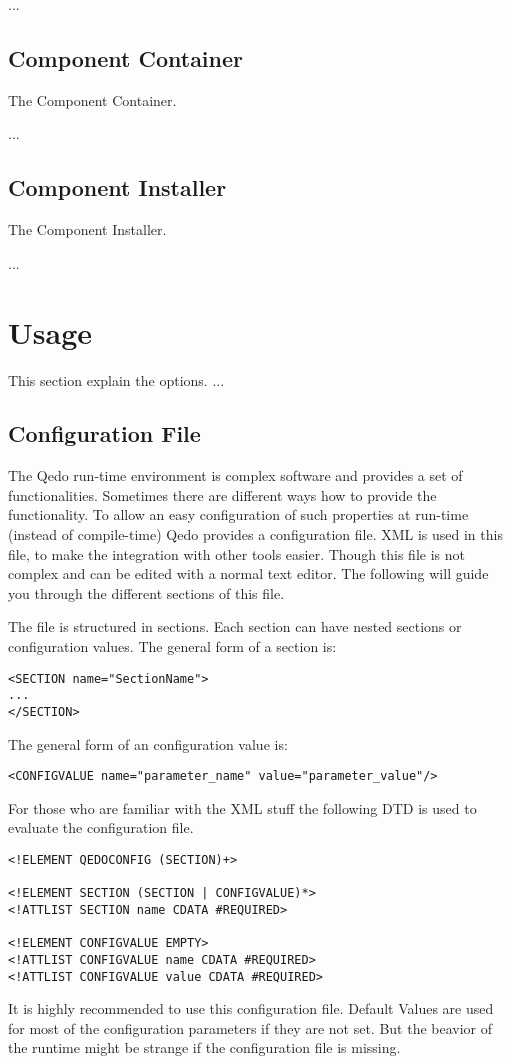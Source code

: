 \documentclass[12pt,a4paper]{report}
\begin{document}
 ... 

\section{Component Container}
\label{sec:ComponentContainer}
The Component Container. 

...

\section{Component Installer}
\label{sec:ComponentInstaller}
The Component Installer.

...

\chapter{Usage}
\label{sec:Usage}
This section explain the options. ...

\section{Configuration File}
\label{sec:ConfigurationFile}
The Qedo run-time environment is complex software and provides a set of functionalities. Sometimes there are different ways how to provide the functionality. To allow an easy configuration of such properties at run-time (instead of compile-time) Qedo provides a configuration file. XML is used in this file, to make the integration with other tools easier. Though this file is not complex and can be edited with a normal text editor. The following will guide you through the different sections of this file.

The file is structured in sections. Each section can have nested sections or configuration values. The general form of a section is:

\begin{verbatim}
<SECTION name="SectionName">
...
</SECTION>
\end{verbatim}

The general form of an configuration value is:
\begin{verbatim}
<CONFIGVALUE name="parameter_name" value="parameter_value"/>
\end{verbatim}

For those who are familiar with the XML stuff the following DTD is used to evaluate the configuration file.

\begin{verbatim}
<!ELEMENT QEDOCONFIG (SECTION)+>

<!ELEMENT SECTION (SECTION | CONFIGVALUE)*>
<!ATTLIST SECTION name CDATA #REQUIRED>

<!ELEMENT CONFIGVALUE EMPTY>
<!ATTLIST CONFIGVALUE name CDATA #REQUIRED>
<!ATTLIST CONFIGVALUE value CDATA #REQUIRED>

\end{verbatim}
It is highly recommended to use this configuration file. Default Values are used for most of the configuration parameters if they are not set. But the beavior of the runtime might be strange if the configuration file is missing.
\end{document}
